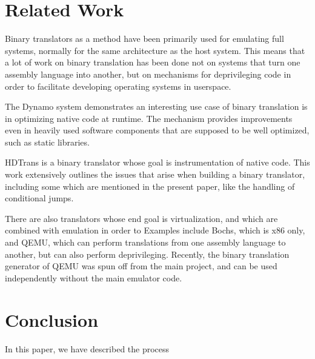 \section{Related Work}

Binary translators as a method have been primarily used for emulating full systems, normally for the same architecture as the host system.
This means that a lot of work on binary translation has been done not on systems that turn one assembly language into another, but on mechanisms for deprivileging code in order to facilitate developing operating systems in userspace. 

The Dynamo\cite{bala2011dynamo} system demonstrates an interesting use case of binary translation is in optimizing native code at runtime. The mechanism provides improvements even in heavily used software components that are supposed to be well optimized, such as static libraries. 

HDTrans\cite{sridhar2006hdtrans} is a binary translator whose goal is instrumentation of native code. This work extensively outlines the issues that arise when building a binary translator, including some which are mentioned in the present paper, like the handling of conditional jumps.

There are also translators whose end goal is virtualization, and which are combined with emulation in order to 
Examples include Bochs\cite{lawton1996bochs}, which is x86 only, and QEMU\cite{bellard2005qemu}, which can perform translations from one assembly language to another, but can also perform deprivileging. 
Recently, the binary translation generator of QEMU was spun off from the main project\cite{libtcg}, and can be used independently without the main emulator code.


\section{Conclusion}

In this paper, we have described the process 

